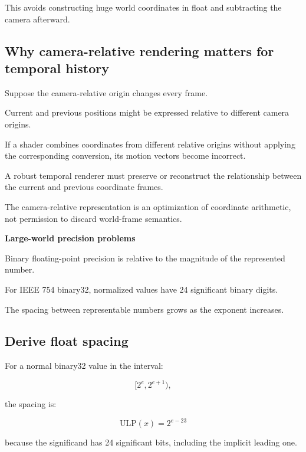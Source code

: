 This avoids constructing huge world coordinates in float and subtracting the camera afterward.

\subsection{Why camera-relative rendering matters for temporal history}\label{02-foundations-ii-ch036-why-camera-relative-rendering-matters-for-temporal-history}

\hypertarget{02-foundations-ii-ch036-why-camera-relative-rendering-matters-for-temporal-history}{}

Suppose the camera-relative origin changes every frame.

Current and previous positions might be expressed relative to different camera origins.

If a shader combines coordinates from different relative origins without applying the corresponding conversion, its motion vectors become incorrect.

A robust temporal renderer must preserve or reconstruct the relationship between the current and previous coordinate frames.

The camera-relative representation is an optimization of coordinate arithmetic, not permission to discard world-frame semantics.

\textbf{Large-world precision problems}

Binary floating-point precision is relative to the magnitude of the represented number.

For IEEE 754 binary32, normalized values have 24 significant binary digits.

The spacing between representable numbers grows as the exponent increases.

\subsection{Derive float spacing}\label{02-foundations-ii-ch036-derive-float-spacing}

\hypertarget{02-foundations-ii-ch036-derive-float-spacing}{}

For a normal binary32 value in the interval:

\[
 [2^e,2^{e+1}),
\]

the spacing is:

\[
 \boxed{ \mathrm{ULP}(x)=2^{e-23} }
\]

because the significand has 24 significant bits, including the implicit leading one.

